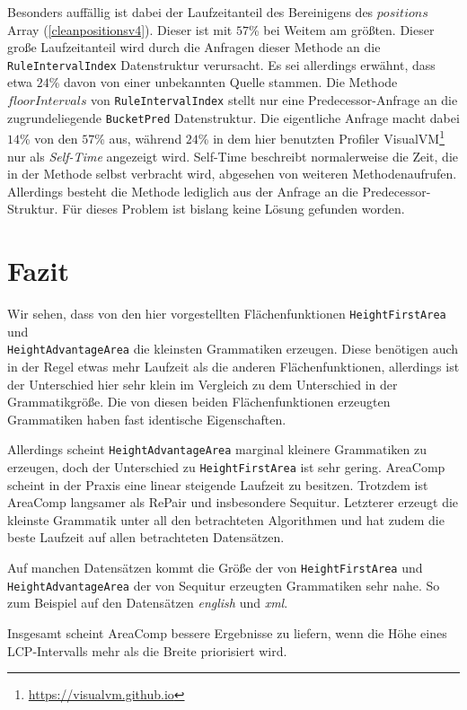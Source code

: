 Besonders auffällig ist dabei der Laufzeitanteil des Bereinigens des $positions$ Array (\autoref{cleanpositionsv4}). Dieser ist mit $57$\% bei Weitem am größten. 
Dieser große Laufzeitanteil wird durch die Anfragen dieser Methode an die \texttt{RuleIntervalIndex} Datenstruktur verursacht.
Es sei allerdings erwähnt, dass etwa $24$\% davon von einer unbekannten Quelle stammen. Die Methode $floorIntervals$ von \texttt{RuleIntervalIndex} stellt nur eine Predecessor-Anfrage an die zugrundeliegende \texttt{BucketPred} Datenstruktur. Die eigentliche Anfrage macht dabei $14$\% von den $57$\% aus, während $24$\% in dem hier benutzten Profiler VisualVM\footnote{\url{https://visualvm.github.io}} nur als \emph{Self-Time} angezeigt wird.
Self-Time beschreibt normalerweise die Zeit, die in der Methode selbst verbracht wird, abgesehen von weiteren Methodenaufrufen. Allerdings besteht die Methode lediglich aus der Anfrage an die Predecessor-Struktur.
Für dieses Problem ist bislang keine Lösung gefunden worden.

\section{Fazit}

Wir sehen, dass von den hier vorgestellten Flächenfunktionen \texttt{HeightFirstArea} und\\
\texttt{HeightAdvantageArea} die kleinsten Grammatiken erzeugen. Diese benötigen auch in der Regel etwas mehr Laufzeit als die anderen Flächenfunktionen, allerdings ist der Unterschied hier sehr klein im Vergleich zu dem Unterschied in der Grammatikgröße. Die von diesen beiden Flächenfunktionen erzeugten Grammatiken haben fast identische Eigenschaften.

Allerdings scheint \texttt{HeightAdvantageArea} marginal kleinere Grammatiken zu erzeugen, doch der Unterschied zu \texttt{HeightFirstArea} ist sehr gering. AreaComp scheint in der Praxis eine linear steigende Laufzeit zu besitzen. Trotzdem ist AreaComp langsamer als RePair und insbesondere Sequitur. Letzterer erzeugt die kleinste Grammatik unter all den betrachteten Algorithmen und hat zudem die beste Laufzeit auf allen betrachteten Datensätzen.

Auf manchen Datensätzen kommt die Größe der von \texttt{HeightFirstArea} und\\
\texttt{HeightAdvantageArea} der von Sequitur erzeugten Grammatiken sehr nahe. So zum Beispiel auf den Datensätzen \emph{english} und \emph{xml}.

Insgesamt scheint AreaComp bessere Ergebnisse zu liefern, wenn die Höhe eines LCP-Intervalls mehr als die Breite priorisiert wird.

